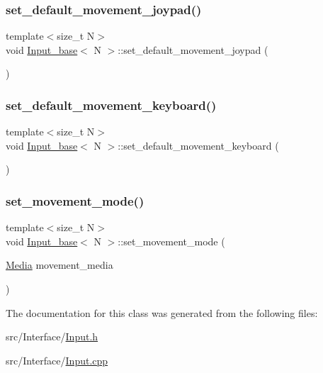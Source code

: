 \mbox{\label{class_input__base_a50d1a01cf671110d8b73c7b48b18095f}} 
\subsubsection{\texorpdfstring{set\+\_\+default\+\_\+movement\+\_\+joypad()}{set\_default\_movement\_joypad()}}
{\footnotesize\ttfamily template$<$size\+\_\+t N$>$ \\
void \mbox{\hyperlink{class_input__base}{Input\+\_\+base}}$<$ N $>$\+::set\+\_\+default\+\_\+movement\+\_\+joypad (\begin{DoxyParamCaption}{ }\end{DoxyParamCaption})}

\mbox{\label{class_input__base_ae4092ec083ca10480a0fd61301b336f1}} 
\subsubsection{\texorpdfstring{set\+\_\+default\+\_\+movement\+\_\+keyboard()}{set\_default\_movement\_keyboard()}}
{\footnotesize\ttfamily template$<$size\+\_\+t N$>$ \\
void \mbox{\hyperlink{class_input__base}{Input\+\_\+base}}$<$ N $>$\+::set\+\_\+default\+\_\+movement\+\_\+keyboard (\begin{DoxyParamCaption}{ }\end{DoxyParamCaption})}

\mbox{\label{class_input__base_a103633f42d3fa58352a12b54ed4b3faf}} 
\subsubsection{\texorpdfstring{set\+\_\+movement\+\_\+mode()}{set\_movement\_mode()}}
{\footnotesize\ttfamily template$<$size\+\_\+t N$>$ \\
void \mbox{\hyperlink{class_input__base}{Input\+\_\+base}}$<$ N $>$\+::set\+\_\+movement\+\_\+mode (\begin{DoxyParamCaption}\item[{\mbox{\hyperlink{class_input__base_a455585e7933485981b3d7bfcad3a47c6}{Media}}}]{movement\+\_\+media }\end{DoxyParamCaption})}



The documentation for this class was generated from the following files\+:\begin{DoxyCompactItemize}
\item 
src/\+Interface/\mbox{\hyperlink{_input_8h}{Input.\+h}}\item 
src/\+Interface/\mbox{\hyperlink{_input_8cpp}{Input.\+cpp}}\end{DoxyCompactItemize}
